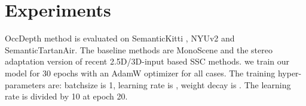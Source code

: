 \documentclass{article}
\begin{document}
 	\begin{table}[!t]
		\centering
		\caption{Baselines of 2.5D/3D-input methods. OccDepth outperforms some indoor baselines and is even comparable to some outdoor baselines. "" means results are cited from MonoScene. "/" means missing results.}
		\label{Baselines}
	\end{table}	
	
	\section{Experiments}
	OccDepth method is evaluated on SemanticKitti \cite{behley2019semantickitti}, NYUv2 \cite{silberman2012indoor} and SemanticTartanAir. The baseline methods are MonoScene \cite{Cao_2022_CVPR} and the stereo adaptation version of recent 2.5D/3D-input based SSC methods. we train our model for 30 epochs with an AdamW \cite{loshchilov2017decoupled} optimizer for all cases. The training hyper-parameters are: batchsize is 1, learning rate is , weight decay is . The learning rate is divided by 10 at epoch 20.
	
\end{document}
